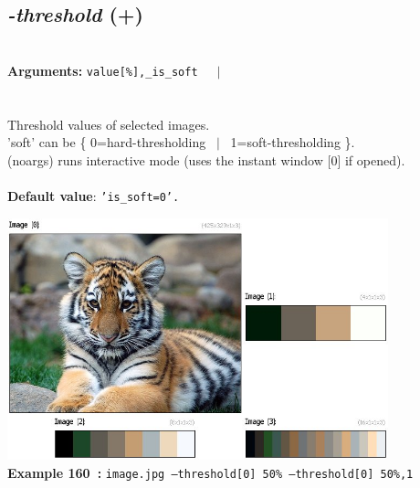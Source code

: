 \documentclass[a4paper,11pt,twoside]{book}
\begin{document}
\subsection{\emph{-threshold} (+)}\vspace*{-0.5em}
~\\\textbf{Arguments: } 
{\small \texttt{value[\%],\_is\_soft}}~~~$|$\\
\\~\\
Threshold values of selected images.
~\\'soft' can be \{ 0=hard-thresholding ~$|$~ 1=soft-thresholding \}.
~\\(noargs) runs interactive mode (uses the instant window [0] if opened).
~\\~\\\textbf{Default value}: {\small \texttt{'is\_soft=0'.}}
\begin{center}\includegraphics[keepaspectratio=true,height=7cm,width=\textwidth]{img/gmic_def160.jpg}\\
{\footnotesize \textbf{Example 160~:} \texttt{image.jpg --threshold[0] 50\% --threshold[0] 50\%,1}}
\end{center}
\end{document}

